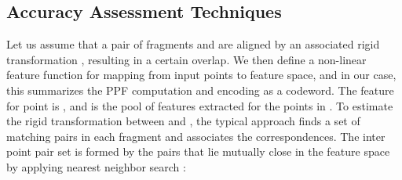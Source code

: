 \begin{table*}[t!]
  \centering
  \caption{Our results on the standard 3DMatch benchmark. \textit{Red Kitchen} data is from 7-scenes~\cite{shotton2013scene} and the rest imported from SUN3D~\cite{xiao2013sun3d}.}
\end{table*} \subsection{Accuracy Assessment Techniques} 

Let us assume that a pair of fragments  and  are aligned by an associated rigid transformation , resulting in a certain overlap. We then define a non-linear feature function  for mapping from input points to feature space, and in our case, this summarizes the PPF computation and encoding as a codeword. The feature for point  is , and  is the pool of features extracted for the points in . To estimate the rigid transformation between  and , the typical approach finds a set of matching pairs in each fragment and associates the correspondences. The inter point pair set  is formed by the pairs  that lie mutually close in the feature space by applying nearest neighbor search :

